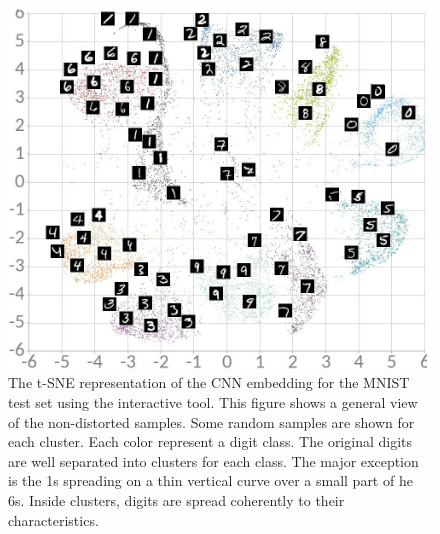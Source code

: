 \documentclass[a4paper,12pt]{report}
\begin{document}
\begin{figure}[t]
    \centering
    \includegraphics[width=\textwidth]{thesis_figures/mnist_nda_tsne.jpg}
    \caption{The t-SNE representation of the CNN embedding for the MNIST test set using the interactive tool.
    This figure shows a general view of the non-distorted samples.
    Some random samples are shown for each cluster.
    Each color represent a digit class.
    The original digits are well separated into clusters for each class.
    The major exception is the 1s spreading on a thin vertical curve over a small part of he 6s.
    Inside clusters, digits are spread coherently to their characteristics.
    }
    \label{fig:mnist_nda_tsne}
\end{figure}
\end{document}
